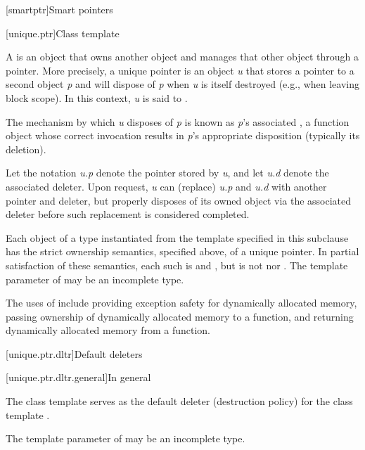 
[smartptr]{Smart pointers}

[unique.ptr]{Class template }

\pnum
A  is an object that owns another object and
manages that other object through a pointer. More precisely, a unique pointer
is an object \textit{u} that stores a pointer to a second object \textit{p} and
will dispose of \textit{p} when \textit{u} is itself destroyed (e.g., when
leaving block scope). In this context, \textit{u} is said
to  .

\pnum
The mechanism by which \textit{u} disposes of \textit{p} is known as
\textit{p}'s associated , a function object whose correct
invocation results in \textit{p}'s appropriate disposition (typically its deletion).

\pnum
Let the notation \textit{u.p} denote the pointer stored by \textit{u}, and
let \textit{u.d} denote the associated deleter. Upon request, \textit{u} can
 (replace) \textit{u.p} and \textit{u.d} with another pointer and
deleter, but properly disposes of its owned object via the associated
deleter before such replacement is considered completed.

\pnum
Each object of a type  instantiated from the  template
specified in this subclause has the strict ownership semantics, specified above,
of a unique pointer. In partial satisfaction of these semantics, each such 
is  and , but is not
 nor .
The template parameter  of  may be an incomplete type.

\pnum
\begin{note}
The uses
of  include providing exception safety for
dynamically allocated memory, passing ownership of dynamically allocated
memory to a function, and returning dynamically allocated memory from a
function.
\end{note}

[unique.ptr.dltr]{Default deleters}

[unique.ptr.dltr.general]{In general}

\pnum
The class template  serves as the default deleter (destruction policy)
for the class template .

\pnum
The template parameter  of  may be
an incomplete type.

